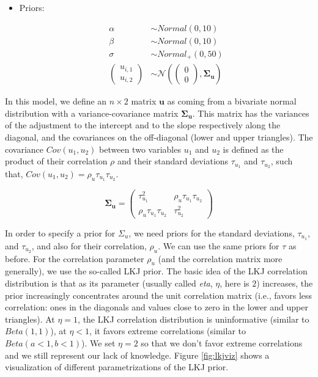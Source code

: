 \documentclass[12pt,]{krantz}
\providecommand{\tightlist}{%
  \setlength{\itemsep}{0pt}\setlength{\parskip}{0pt}}
\theoremstyle{definition}
\theoremstyle{definition}
\theoremstyle{definition}
\theoremstyle{remark}
\begin{document}
\begin{itemize}
\tightlist
\item
  Priors:

  \begin{equation}
   \begin{aligned}
     \alpha & \sim Normal(0,10) \\
     \beta  & \sim Normal(0,10) \\
  \sigma  &\sim Normal_+(0,50)\\
  {\begin{pmatrix}
  u_{i,1} \\
  u_{i,2}
  \end{pmatrix}}
     &\sim {\mathcal {N}}
  \left(
     {\begin{pmatrix} 
  0\\
  0
     \end{pmatrix}}
   ,\boldsymbol{\Sigma_u} \right)
   \end{aligned}
   \end{equation}
\end{itemize}

In this model, we define an \(n\times 2\) matrix \(\mathbf{u}\) as
coming from a bivariate normal distribution with a variance-covariance
matrix \(\boldsymbol{\Sigma_u}\). This matrix has the variances of the
adjustment to the intercept and to the slope respectively along the
diagonal, and the covariances on the off-diagonal (lower and upper
triangles). The covariance \(Cov(u_1,u_2)\) between two variables
\(u_1\) and \(u_2\) is defined as the product of their correlation
\(\rho\) and their standard deviations \(\tau_{u_1}\) and
\(\tau_{u_2}\), such that,
\(Cov(u_1,u_2) = \rho_u \tau_{u_1} \tau_{u_2}\).

\begin{equation}
\boldsymbol{\Sigma_u} = 
{\begin{pmatrix} 
\tau_{u_1}^2 & \rho_u \tau_{u_1} \tau_{u_2} \\ 
\rho_u \tau_{u_1} \tau_{u_2} & \tau_{u_2}^2
\end{pmatrix}}
\end{equation}

In order to specify a prior for \(\Sigma_u\), we need priors for the
standard deviations, \(\tau_{u_1}\), and \(\tau_{u_2}\), and also for
their correlation, \(\rho_u\). We can use the same priors for \(\tau\)
as before. For the correlation parameter \(\rho_u\) (and the correlation
matrix more generally), we use the so-called LKJ prior. The basic idea
of the LKJ correlation distribution is that as its parameter (usually
called \emph{eta}, \(\eta\), here is \(2\)) increases, the prior
increasingly concentrates around the unit correlation matrix (i.e.,
favors less correlation: ones in the diagonals and values close to zero
in the lower and upper triangles). At \(\eta = 1\), the LKJ correlation
distribution is uninformative (similar to \(Beta(1,1)\)), at
\(\eta < 1\), it favors extreme correlations (similar to
\(Beta(a<1,b<1)\)). We set \(\eta = 2\) so that we don't favor extreme
correlations and we still represent our lack of knowledge. Figure
\ref{fig:lkjviz} shows a visualization of different parametrizations of
the LKJ prior.
\end{document}
